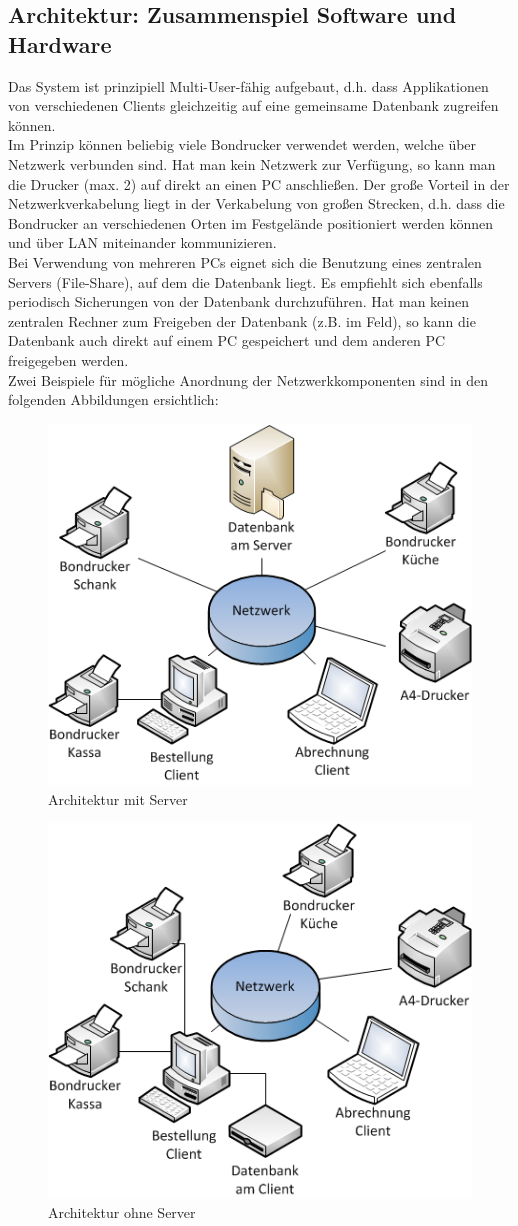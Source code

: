 \documentclass[
10pt, %
a4paper, %
oneside, %
headinclude,footinclude, %
BCOR5mm, %
]{scrartcl}
\theoremstyle{definition} %
\theoremstyle{plain} %
\theoremstyle{remark} %
\begin{document}
\subsection{Architektur: Zusammenspiel Software und Hardware}
Das System ist prinzipiell Multi-User-fähig aufgebaut, d.h. dass Applikationen von verschiedenen Clients gleichzeitig auf eine gemeinsame Datenbank zugreifen können. \\
Im Prinzip können beliebig viele Bondrucker verwendet werden, welche über Netzwerk verbunden sind. Hat man kein Netzwerk zur Verfügung, so kann man die Drucker (max. 2) auf direkt an einen PC anschließen. Der große Vorteil in der Netzwerkverkabelung liegt in der Verkabelung von großen Strecken, d.h. dass die Bondrucker an verschiedenen Orten im Festgelände positioniert werden können und über LAN miteinander kommunizieren. \\
Bei Verwendung von mehreren PCs eignet sich die Benutzung eines zentralen Servers (File-Share), auf dem die Datenbank liegt. Es empfiehlt sich ebenfalls periodisch Sicherungen von der Datenbank durchzuführen. Hat man keinen zentralen Rechner zum Freigeben der Datenbank (z.B. im Feld), so kann die Datenbank auch direkt auf einem PC gespeichert und dem anderen PC freigegeben werden. \\

Zwei Beispiele für mögliche Anordnung der Netzwerkkomponenten sind in den folgenden Abbildungen ersichtlich:

\begin{figure}[h]
\centering 
\includegraphics[width=0.5\columnwidth]{figures/mit_server.png} 
\caption{Architektur mit Server} 
\label{fig:mit_server} 
\end{figure}

\begin{figure}[h]
\centering 
\includegraphics[width=0.5\columnwidth]{figures/ohne_server.png} 
\caption{Architektur ohne Server} 
\label{fig:ohne_server} 
\end{figure}
\end{document}
